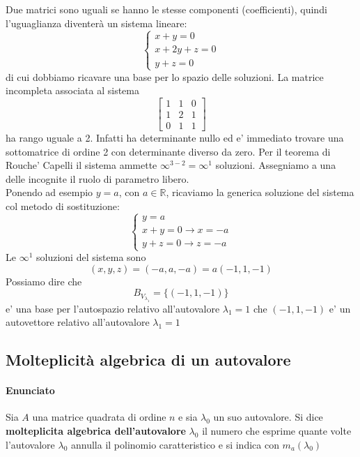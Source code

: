 \documentclass[a4paper, 10pt]{article}
\begin{document}
	Due matrici sono uguali se hanno le stesse componenti (coefficienti), quindi l'uguaglianza diventerà un sistema lineare:
	\[ \begin{cases} x + y = 0 \\ x + 2y + z = 0 \\ y + z = 0 \end{cases} \] di cui dobbiamo ricavare una base per lo spazio
	 delle soluzioni. La matrice incompleta associata al sistema 
	\[ \begin{bmatrix} 1 & 1 & 0 \\ 1 & 2 & 1 \\ 0 & 1 & 1 \end{bmatrix} \] ha rango uguale a 2. 
	Infatti ha determinante nullo ed e' immediato trovare una sottomatrice di ordine 2 con determinante diverso da zero. 
	Per il teorema di Rouche' Capelli il sistema ammette $\infty^{3-2} = \infty^1$ soluzioni. 
	Assegniamo a una delle incognite il ruolo di parametro libero. \\Ponendo ad esempio $y = a$, con $a \in \mathbb{R}$,
	ricaviamo la generica soluzione del sistema col metodo di sostituzione:
	\[ \begin{cases} y = a \\ x + y = 0 \rightarrow x = -a \\ y + z = 0 \rightarrow z = -a \end{cases} \]
	Le $\infty^1$ soluzioni del sistema sono \[ (x,y,z) = (-a,a,-a) = a(-1,1,-1) \]
	Possiamo dire che \[ B_{V_{\lambda_1}} = \lbrace(-1,1,-1) \rbrace \] e' una base per l'autospazio 
	relativo all'autovalore $\lambda_1 = 1$ che $(-1,1,-1)$ e' un autovettore relativo all'autovalore $\lambda_1 = 1$
	
	\subsection{Molteplicità algebrica di un autovalore}
	\paragraph*{Enunciato}
	Sia $A$ una matrice quadrata di ordine $n$ e sia $\lambda_0$ un suo autovalore. Si dice \textbf{molteplicita algebrica
	dell'autovalore} $\lambda_0$ il numero che esprime quante volte l'autovalore $\lambda_0$ annulla il polinomio
	caratteristico e si indica con $m_a(\lambda_0)$
\end{document}
